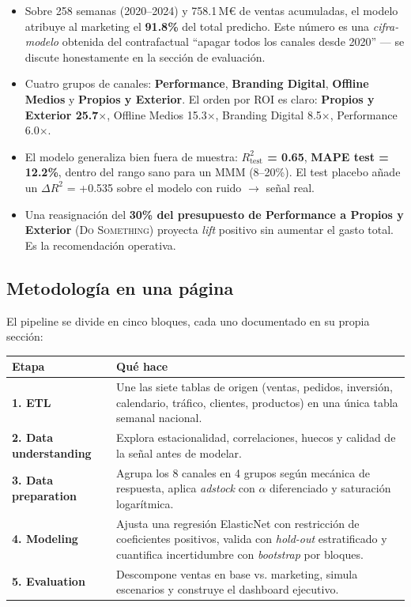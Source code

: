 \begin{execbox}
\begin{itemize}[leftmargin=*, itemsep=3pt, topsep=2pt]
    \item Sobre 258 semanas (2020--2024) y 758.1\,M€ de ventas acumuladas, el modelo atribuye al marketing el \textbf{91.8\%} del total predicho. Este número es una \textit{cifra-modelo} obtenida del contrafactual ``apagar todos los canales desde 2020'' — se discute honestamente en la sección de evaluación.
    \item Cuatro grupos de canales: \textbf{Performance}, \textbf{Branding Digital}, \textbf{Offline Medios} y \textbf{Propios y Exterior}. El orden por ROI es claro: \textbf{Propios y Exterior 25.7$\times$}, Offline Medios 15.3$\times$, Branding Digital 8.5$\times$, Performance 6.0$\times$.
    \item El modelo generaliza bien fuera de muestra: \textbf{$R^2_{\text{test}}$ = 0.65}, \textbf{MAPE test = 12.2\%}, dentro del rango sano para un MMM (8--20\%). El test placebo añade un $\Delta R^2$ = +0.535 sobre el modelo con ruido $\rightarrow$ señal real.
    \item Una reasignación del \textbf{30\% del presupuesto de Performance a Propios y Exterior} (\textsc{Do Something}) proyecta \textit{lift} positivo sin aumentar el gasto total. Es la recomendación operativa.
\end{itemize}
\end{execbox}

\subsection{Metodología en una página}

El pipeline se divide en cinco bloques, cada uno documentado en su propia sección:

\begin{center}
\begin{tabular}{@{}p{3.2cm} p{11cm}@{}}
\toprule
\textbf{Etapa} & \textbf{Qué hace} \\
\midrule
\textcolor{kmgolddark}{\textbf{1. ETL}} & Une las siete tablas de origen (ventas, pedidos, inversión, calendario, tráfico, clientes, productos) en una única tabla semanal nacional. \\
\textcolor{kmgolddark}{\textbf{2. Data understanding}} & Explora estacionalidad, correlaciones, huecos y calidad de la señal antes de modelar. \\
\textcolor{kmgolddark}{\textbf{3. Data preparation}} & Agrupa los 8 canales en 4 grupos según mecánica de respuesta, aplica \textit{adstock} con $\alpha$ diferenciado y saturación logarítmica. \\
\textcolor{kmgolddark}{\textbf{4. Modeling}} & Ajusta una regresión ElasticNet con restricción de coeficientes positivos, valida con \textit{hold-out} estratificado y cuantifica incertidumbre con \textit{bootstrap} por bloques. \\
\textcolor{kmgolddark}{\textbf{5. Evaluation}} & Descompone ventas en base vs. marketing, simula escenarios y construye el dashboard ejecutivo. \\
\bottomrule
\end{tabular}
\end{center}

